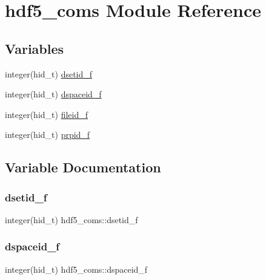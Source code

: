 \hypertarget{namespacehdf5__coms}{}\section{hdf5\+\_\+coms Module Reference}
\label{namespacehdf5__coms}
\subsection*{Variables}
\begin{DoxyCompactItemize}
\item 
integer(hid\+\_\+t) \hyperlink{namespacehdf5__coms_a31611e38319474913c7422e2cf240a25}{dsetid\+\_\+f}
\item 
integer(hid\+\_\+t) \hyperlink{namespacehdf5__coms_ad7b71a5a383dba57521ae99e69fe792c}{dspaceid\+\_\+f}
\item 
integer(hid\+\_\+t) \hyperlink{namespacehdf5__coms_a5bdf3f7a13856c782dc68d5c2bffccb4}{fileid\+\_\+f}
\item 
integer(hid\+\_\+t) \hyperlink{namespacehdf5__coms_a84009e52b52f9347b40c3e5d71cb1eb0}{prpid\+\_\+f}
\end{DoxyCompactItemize}


\subsection{Variable Documentation}
\mbox{\label{namespacehdf5__coms_a31611e38319474913c7422e2cf240a25}} 
\subsubsection{\texorpdfstring{dsetid\+\_\+f}{dsetid\_f}}
{\footnotesize\ttfamily integer(hid\+\_\+t) hdf5\+\_\+coms\+::dsetid\+\_\+f}

\mbox{\label{namespacehdf5__coms_ad7b71a5a383dba57521ae99e69fe792c}} 
\subsubsection{\texorpdfstring{dspaceid\+\_\+f}{dspaceid\_f}}
{\footnotesize\ttfamily integer(hid\+\_\+t) hdf5\+\_\+coms\+::dspaceid\+\_\+f}

